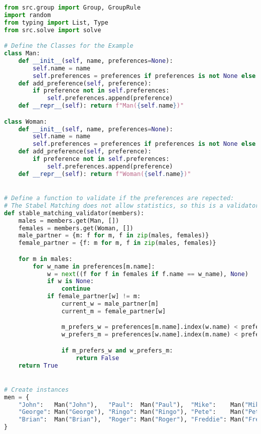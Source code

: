 \begin{lstlisting}[language=Python, caption={Creating and solving the Stable Marriage Problem using this framework.}, label={script:stable_marriage}]
from src.group import Group, GroupRule
import random
from typing import List, Type
from src.solve import solve

# Define the Classes for the Example
class Man:
    def __init__(self, name, preferences=None):
        self.name = name
        self.preferences = preferences if preferences is not None else []
    def add_preference(self, preference):
        if preference not in self.preferences:
            self.preferences.append(preference)
    def __repr__(self): return f"Man({self.name})"

class Woman:
    def __init__(self, name, preferences=None):
        self.name = name
        self.preferences = preferences if preferences is not None else []
    def add_preference(self, preference):
        if preference not in self.preferences:
            self.preferences.append(preference)
    def __repr__(self): return f"Woman({self.name})"


# Define a function to validate if the preferences are repected:
# The Stabel Matching does not allow statistics, so this is a validator function.
def stable_matching_validator(members):
    males = members.get(Man, [])
    females = members.get(Woman, [])
    male_partner = {m: f for m, f in zip(males, females)}
    female_partner = {f: m for m, f in zip(males, females)}

    for m in males:
        for w_name in preferences[m.name]:
            w = next((f for f in females if f.name == w_name), None)
            if w is None:
                continue
            if female_partner[w] != m:
                current_w = male_partner[m]
                current_m = female_partner[w]

                m_prefers_w = preferences[m.name].index(w.name) < preferences[m.name].index(current_w.name)
                w_prefers_m = preferences[w.name].index(m.name) < preferences[w.name].index(current_m.name)

                if m_prefers_w and w_prefers_m:
                    return False
    return True


# Create instances
men = {
    "John":   Man("John"),   "Paul":  Man("Paul"),  "Mike":    Man("Mike"),
    "George": Man("George"), "Ringo": Man("Ringo"), "Pete":    Man("Pete"),
    "Brian":  Man("Brian"),  "Roger": Man("Roger"), "Freddie": Man("Freddie")
}


\end{lstlisting}
